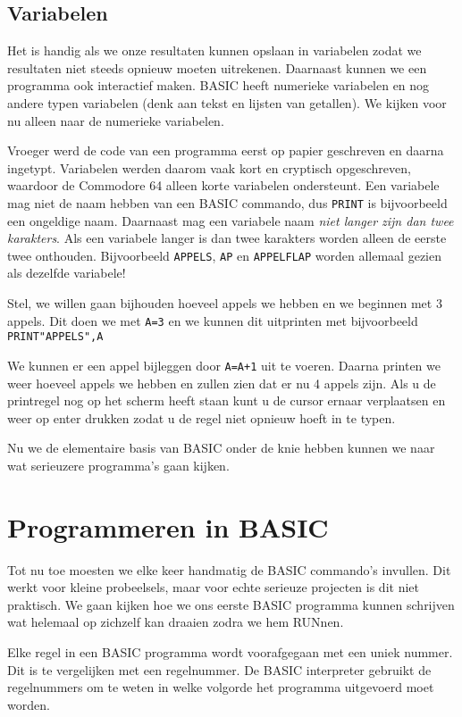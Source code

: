 \documentclass{article}
\begin{document}
\subsection{Variabelen}

Het is handig als we onze resultaten kunnen opslaan in variabelen zodat we resultaten niet steeds opnieuw moeten uitrekenen.
Daarnaast kunnen we een programma ook interactief maken.
BASIC heeft numerieke variabelen en nog andere typen variabelen (denk aan tekst en lijsten van getallen).
We kijken voor nu alleen naar de numerieke variabelen.

Vroeger werd de code van een programma eerst op papier geschreven en daarna ingetypt.
Variabelen werden daarom vaak kort en cryptisch opgeschreven, waardoor de Commodore 64 alleen korte variabelen ondersteunt.
Een variabele mag niet de naam hebben van een BASIC commando, dus \verb:PRINT: is bijvoorbeeld een ongeldige naam.
Daarnaast mag een variabele naam \emph{niet langer zijn dan twee karakters}.
Als een variabele langer is dan twee karakters worden alleen de eerste twee onthouden.
Bijvoorbeeld \verb:APPELS:, \verb:AP: en \verb:APPELFLAP: worden allemaal gezien als dezelfde variabele!

Stel, we willen gaan bijhouden hoeveel appels we hebben en we beginnen met 3 appels.
Dit doen we met \verb:A=3: en we kunnen dit uitprinten met bijvoorbeeld \verb:PRINT"APPELS",A:

We kunnen er een appel bijleggen door \verb:A=A+1: uit te voeren.
Daarna printen we weer hoeveel appels we hebben en zullen zien dat er nu 4 appels zijn.
Als u de printregel nog op het scherm heeft staan kunt u de cursor ernaar verplaatsen en weer op enter drukken zodat u de regel niet opnieuw hoeft in te typen.

Nu we de elementaire basis van BASIC onder de knie hebben kunnen we naar wat serieuzere programma's gaan kijken.

\section{Programmeren in BASIC}

Tot nu toe moesten we elke keer handmatig de BASIC commando's invullen.
Dit werkt voor kleine probeelsels, maar voor echte serieuze projecten is dit niet praktisch.
We gaan kijken hoe we ons eerste BASIC programma kunnen schrijven wat helemaal op zichzelf kan draaien zodra we hem RUNnen.

Elke regel in een BASIC programma wordt voorafgegaan met een uniek nummer.
Dit is te vergelijken met een regelnummer.
De BASIC interpreter gebruikt de regelnummers om te weten in welke volgorde het programma uitgevoerd moet worden.
\end{document}
